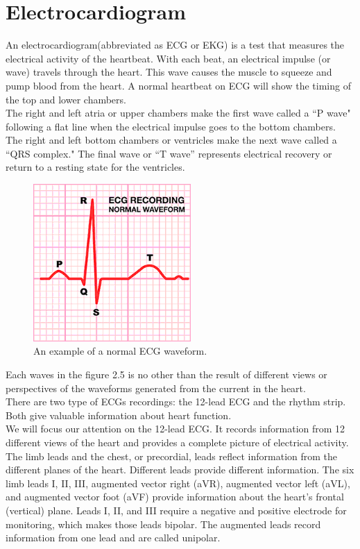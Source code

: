 \section{Electrocardiogram}
An electrocardiogram(abbreviated as ECG or EKG) is a test that measures the electrical activity of the heartbeat. With each beat, an electrical impulse (or wave) travels through the heart. This wave causes the muscle to squeeze and pump blood from the heart. A normal heartbeat on ECG will show the timing of the top and lower chambers.\\
The right and left atria or upper chambers make the first wave called a “P wave" following a flat line when the electrical impulse goes to the bottom chambers. The right and left bottom chambers or ventricles make the next wave called a “QRS complex." The final wave or “T wave” represents electrical recovery or return to a resting state for the ventricles.\\
\begin{figure}[ht!]
	\centering
	\includegraphics[width=60mm]{figures/ch2/5.png}
	\caption{An example of a normal ECG waveform. }
	\label{fig2.5}
\end{figure}
Each waves in the figure 2.5 is no other than the result of different views or perspectives of the waveforms generated from the current in the heart.\\
There are two type of ECGs recordings: the 12-lead ECG  and the rhythm strip. Both give valuable information about heart function.\\
We will focus our attention on the 12-lead ECG. It records information from 12 different views of the heart and provides a complete picture of electrical activity. The limb leads and the chest, or precordial, leads reflect information from the different planes of the heart. Different leads provide different information. The six limb leads I, II, III, augmented vector right (aVR), augmented vector left (aVL), and augmented vector foot (aVF) provide information about the heart’s frontal (vertical) plane. Leads I, II, and III require a negative and positive electrode for monitoring, which makes those leads bipolar. The augmented leads record information from one lead and are called unipolar.\\

